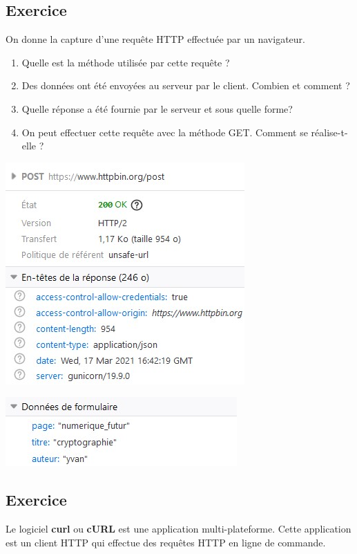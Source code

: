 \documentclass[11pt,a4paper]{article}
\newcounter{numexo}
\begin{document}
\subsection*{\Large Exercice \thenumexo}
\begin{minipage}{9cm}
On donne la capture d'une requête HTTP effectuée par un navigateur.
\begin{enumerate}
\item Quelle est la méthode utilisée par cette requête ?
\item Des données ont été envoyées au serveur par le client. Combien et comment ?
\item Quelle réponse a été fournie par le serveur et sous quelle forme?
\item On peut effectuer cette requête avec la méthode GET. Comment se réalise-t-elle ?
\end{enumerate}
\vspace*{4.5cm}
\end{minipage}\hfill
\begin{minipage}{9cm}
\includegraphics[scale=0.9]{img/reqEx3.jpg}

\includegraphics[scale=0.9]{img/req2Ex3.jpg}
\end{minipage}


\newpage

\addtocounter{numexo}{1}
\subsection*{\Large Exercice \thenumexo}
Le logiciel \textbf{curl} ou \textbf{cURL} est une application multi-plateforme. Cette application est un client HTTP qui effectue des requêtes HTTP en ligne de commande.
\end{document}
